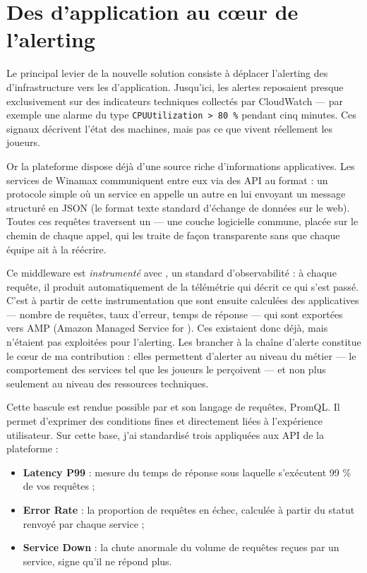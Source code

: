 \section{Des  d'application au cœur de l'alerting}

Le principal levier de la nouvelle solution consiste à déplacer l'alerting des  d'infrastructure
vers les  d'application. Jusqu'ici, les alertes reposaient presque exclusivement sur des
indicateurs techniques collectés par CloudWatch — par exemple une alarme du type
\texttt{CPUUtilization > 80 \%} pendant cinq minutes. Ces signaux décrivent l'état des machines, mais
pas ce que vivent réellement les joueurs.

Or la plateforme dispose déjà d'une source riche d'informations applicatives. Les services de Winamax
communiquent entre eux via des API au format  : un protocole simple où un service en appelle
un autre en lui envoyant un message structuré en JSON (le format texte standard d'échange de données
sur le web). Toutes ces requêtes traversent un \emph{} — une couche logicielle commune,
placée sur le chemin de chaque appel, qui les traite de façon transparente sans que chaque équipe ait à
la réécrire.

Ce middleware est \emph{instrumenté} avec , un standard d'observabilité : à chaque
requête, il produit automatiquement de la télémétrie qui décrit ce qui s'est passé. C'est à partir de cette instrumentation que sont ensuite calculées des 
applicatives — nombre de requêtes, taux d'erreur, temps de réponse — qui sont exportées vers AMP
(Amazon Managed Service for ). Ces  existaient donc déjà, mais n'étaient pas
exploitées pour l'alerting. Les brancher à la chaîne d'alerte constitue le cœur de ma contribution : elles
permettent d'alerter au niveau du métier — le comportement des services tel que les joueurs le
perçoivent — et non plus seulement au niveau des ressources techniques.

Cette bascule est rendue possible par  et son langage de requêtes, PromQL. Il permet
d'exprimer des conditions fines et directement liées à l'expérience utilisateur. Sur cette base, j'ai
standardisé trois  appliquées aux API de la plateforme :

\begin{itemize}
	\item \textbf{Latency P99} : mesure du temps de réponse sous laquelle s'exécutent 99 \% de vos requêtes ;
	\item \textbf{Error Rate} : la proportion de requêtes en échec, calculée à partir du statut  renvoyé par chaque service ;
	\item \textbf{Service Down} : la chute anormale du volume de requêtes reçues par un service, signe qu'il ne répond plus.
\end{itemize}

